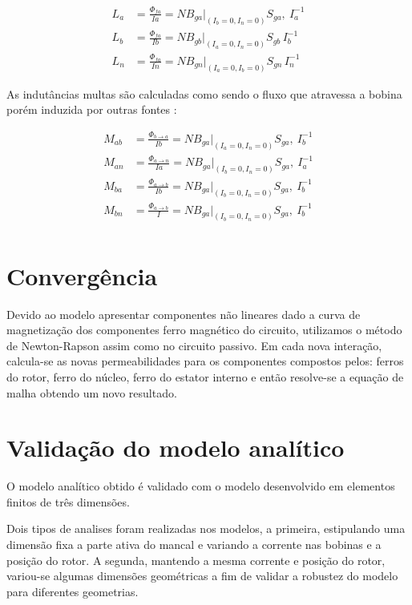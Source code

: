 \begin{align}
L_{a} &= \frac{\Phi_{fa}}{Ia} = N B_{ga}\biggr\rvert_{(I_b = 0, I_n = 0)} S_{ga} ,\ I_a^{-1} \\
L_{b} &= \frac{\Phi_{fa}}{Ib} = N B_{gb}\biggr\rvert_{(I_a = 0, I_n = 0)} S_{gb} \, I_b^{-1} \\
L_{n} &= \frac{\Phi_{fa}}{In} = N B_{gn}\biggr\rvert_{(I_a = 0, I_b = 0)} S_{gn} \, I_n^{-1} %
\end{align}

As indutâncias multas são calculadas como sendo o fluxo que atravessa a bobina porém induzida por outras fontes :

\begin{align}
M_{ab} &= \frac{\Phi_{b \rightarrow a}}{Ib} = N B_{ga}\biggr\rvert_{(I_a = 0, I_n = 0)} S_{ga} ,\ I_b^{-1} \\
M_{an} &= \frac{\Phi_{a \rightarrow n}}{Ia} = N B_{ga}\biggr\rvert_{(I_b = 0, I_n = 0)} S_{ga} ,\ I_a^{-1} \\
M_{ba} &= \frac{\Phi_{a \rightarrow b}}{Ib} = N B_{ga}\biggr\rvert_{(I_b = 0, I_n = 0)} S_{ga} ,\ I_b^{-1} \\
M_{bn} &= \frac{\Phi_{a \rightarrow b}}{I} = N B_{ga}\biggr\rvert_{(I_b = 0, I_n = 0)} S_{ga} ,\ I_b^{-1} \\
\end{align}

\section{Convergência}

Devido ao modelo apresentar componentes não lineares dado a curva de magnetização dos componentes ferro magnético do circuito, utilizamos o método de Newton-Rapson assim como no circuito passivo. Em cada nova interação, calcula-se as novas permeabilidades para os componentes compostos pelos: ferros do rotor, ferro do núcleo, ferro do estator interno e então resolve-se a equação de malha obtendo um novo resultado.

\section{Validação do modelo analítico}

O modelo analítico obtido é validado com o modelo desenvolvido em elementos finitos de três dimensões.

Dois tipos de analises foram realizadas nos modelos, a primeira, estipulando uma dimensão fixa a parte ativa do mancal e variando a corrente nas bobinas e a posição do rotor. A segunda, mantendo a mesma corrente e posição do rotor, variou-se algumas dimensões geométricas a fim de validar a robustez do modelo para diferentes geometrias.

